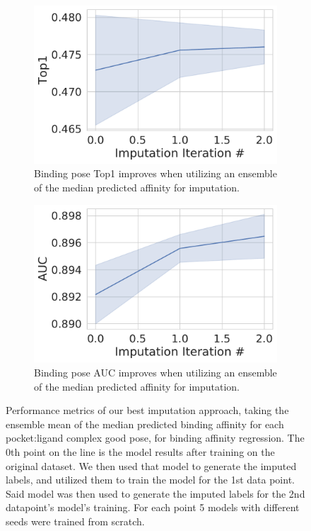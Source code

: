\documentclass[journal=jmcmar,manuscript=article]{achemso}
\begin{document}
\begin{figure}[tbph]
    \begin{subfigure}[t]{0.48\textwidth}
        \centering
        \includegraphics[width=\linewidth]{figures/MedGOEnsTop1.pdf}
        \caption{Binding pose Top1 improves when utilizing an ensemble of the median predicted affinity for imputation.}
    \end{subfigure}
    \hfill
    \begin{subfigure}[t]{0.48\textwidth}
        \centering
        \includegraphics[width=\linewidth]{figures/MedGOEnsAUC.pdf}
        \caption{Binding pose AUC improves when utilizing an ensemble of the median predicted affinity for imputation.}
    \end{subfigure}
    \caption{Performance metrics of our best imputation approach, taking the ensemble mean of the median predicted binding affinity for each pocket:ligand complex good pose, for binding affinity regression. The 0th point on the line is the model results after training on the original dataset. We then used that model to generate the imputed labels, and utilized them to train the model for the 1st data point. Said model was then used to generate the imputed labels for the 2nd datapoint's model's training. For each point 5 models with different seeds were trained from scratch.}
    \label{fig:medGOEnsOverall}
\end{figure}
\end{document}
